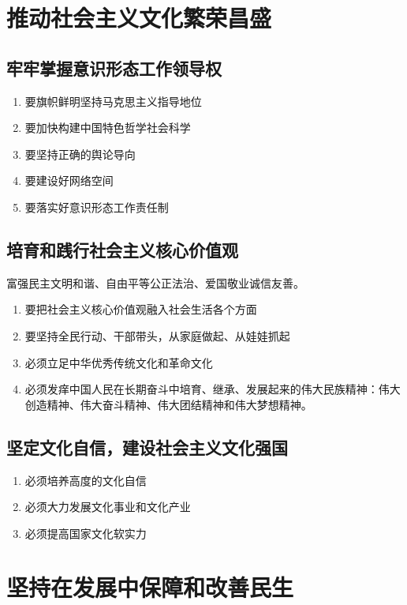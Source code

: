 \section{推动社会主义文化繁荣昌盛}
    \subsection{牢牢掌握意识形态工作领导权}
        \begin{enumerate}
            \item 要旗帜鲜明坚持马克思主义指导地位
            \item 要加快构建中国特色哲学社会科学
            \item 要坚持正确的舆论导向
            \item 要建设好网络空间
            \item 要落实好意识形态工作责任制
        \end{enumerate}

    \subsection{培育和践行社会主义核心价值观}
        富强民主文明和谐、自由平等公正法治、爱国敬业诚信友善。
        \begin{enumerate}
            \item 要把社会主义核心价值观融入社会生活各个方面
            \item 要坚持全民行动、干部带头，从家庭做起、从娃娃抓起
            \item 必须立足中华优秀传统文化和革命文化
            \item 必须发痒中国人民在长期奋斗中培育、继承、发展起来的伟大民族精神：伟大创造精神、伟大奋斗精神、伟大团结精神和伟大梦想精神。
        \end{enumerate}

    \subsection{坚定文化自信，建设社会主义文化强国}
        \begin{enumerate}
            \item 必须培养高度的文化自信
            \item 必须大力发展文化事业和文化产业
            \item 必须提高国家文化软实力
        \end{enumerate}


\section{坚持在发展中保障和改善民生}
